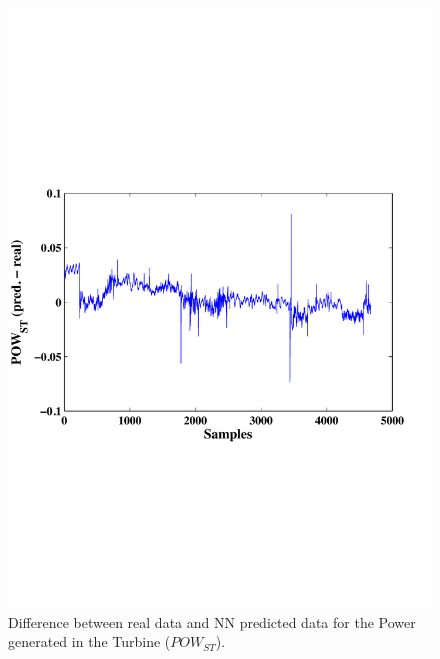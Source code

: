 \begin{figure}
\centering
\includegraphics[width=1\textwidth]{figures/POWdiff.pdf}
\caption{Difference between real data and NN predicted data for the Power generated in the Turbine ($POW_{ST}$).}
\label{Pturbine}
\end{figure}

